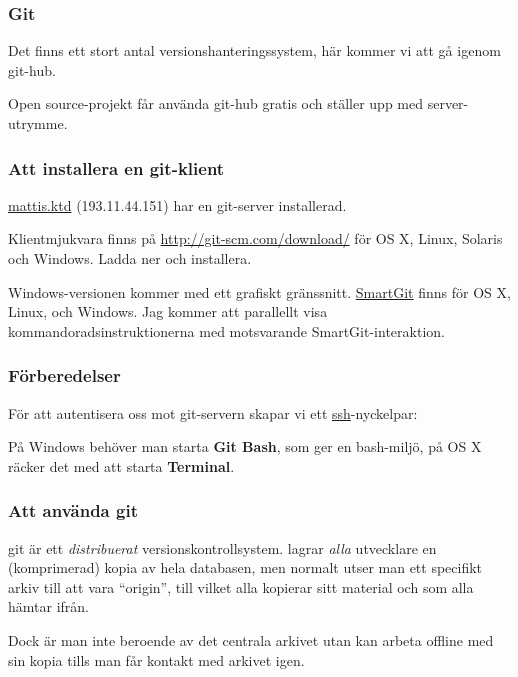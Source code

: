 \documentclass[swedish]{beamer}
\newenvironment{dialogue}{%
\VerbatimEnvironment
\begin{Verbatim}[fontsize=\footnotesize,commandchars=\#\(\)]%
}
{%
\end{Verbatim}
}
\begin{document}
\begin{frame}
\frametitle{Git}
Det finns ett stort antal versionshanteringssystem, här kommer vi att gå igenom git-hub.

Open source-projekt får använda git-hub gratis och ställer upp med server-utrymme.

\end{frame}


\begin{frame}
\frametitle{Att installera en git-klient}
\url{mattis.ktd} (193.11.44.151) har en git-server installerad.

Klientmjukvara finns på \url{http://git-scm.com/download/} för OS X, Linux, Solaris och Windows.  Ladda ner och installera.

Windows-versionen kommer med ett grafiskt gränssnitt.  \href{http://www.syntevo.com/smartgit/download}{SmartGit} finns för OS X, Linux, och Windows. Jag kommer att parallellt visa kommandoradsinstruktionerna med motsvarande SmartGit-interaktion.

\end{frame}

\begin{frame}[fragile]
\frametitle{Förberedelser}
För att autentisera oss mot git-servern skapar vi ett \href{http://www.openssh.com/}{ssh}-nyckelpar:

På Windows behöver man starta \textbf{Git Bash}, som ger en bash-miljö, på OS X räcker det med att starta \textbf{Terminal}.
\end{frame}



\begin{frame}
  \frametitle{Att använda git} git är ett \emph{distribuerat} versionskontrollsystem.  \Mao lagrar \emph{alla} utvecklare en (komprimerad) kopia av hela databasen, men normalt utser man ett specifikt arkiv till att vara ``origin'', till vilket alla kopierar sitt material och som alla hämtar ifrån.

Dock är man inte beroende av det centrala arkivet utan kan arbeta offline med sin kopia tills man får kontakt med arkivet igen.

\end{frame}
\end{document}
